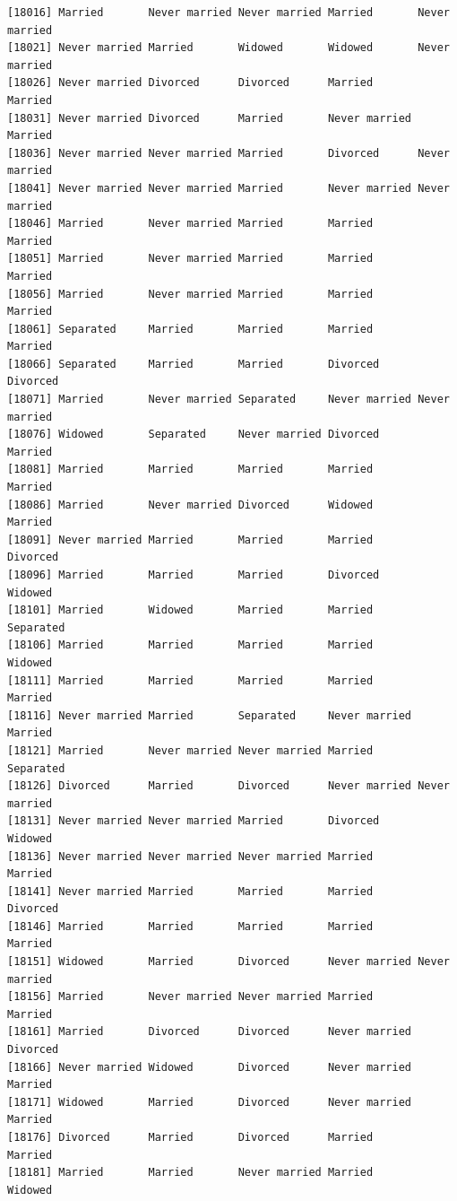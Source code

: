 \documentclass[
  letterpaper,
  DIV=11,
  numbers=noendperiod,
  oneside]{scrartcl}
\begin{document}
\begin{verbatim}
[18016] Married       Never married Never married Married       Never married
[18021] Never married Married       Widowed       Widowed       Never married
[18026] Never married Divorced      Divorced      Married       Married      
[18031] Never married Divorced      Married       Never married Married      
[18036] Never married Never married Married       Divorced      Never married
[18041] Never married Never married Married       Never married Never married
[18046] Married       Never married Married       Married       Married      
[18051] Married       Never married Married       Married       Married      
[18056] Married       Never married Married       Married       Married      
[18061] Separated     Married       Married       Married       Married      
[18066] Separated     Married       Married       Divorced      Divorced     
[18071] Married       Never married Separated     Never married Never married
[18076] Widowed       Separated     Never married Divorced      Married      
[18081] Married       Married       Married       Married       Married      
[18086] Married       Never married Divorced      Widowed       Married      
[18091] Never married Married       Married       Married       Divorced     
[18096] Married       Married       Married       Divorced      Widowed      
[18101] Married       Widowed       Married       Married       Separated    
[18106] Married       Married       Married       Married       Widowed      
[18111] Married       Married       Married       Married       Married      
[18116] Never married Married       Separated     Never married Married      
[18121] Married       Never married Never married Married       Separated    
[18126] Divorced      Married       Divorced      Never married Never married
[18131] Never married Never married Married       Divorced      Widowed      
[18136] Never married Never married Never married Married       Married      
[18141] Never married Married       Married       Married       Divorced     
[18146] Married       Married       Married       Married       Married      
[18151] Widowed       Married       Divorced      Never married Never married
[18156] Married       Never married Never married Married       Married      
[18161] Married       Divorced      Divorced      Never married Divorced     
[18166] Never married Widowed       Divorced      Never married Married      
[18171] Widowed       Married       Divorced      Never married Married      
[18176] Divorced      Married       Divorced      Married       Married      
[18181] Married       Married       Never married Married       Widowed      

\end{verbatim}
\end{document}
